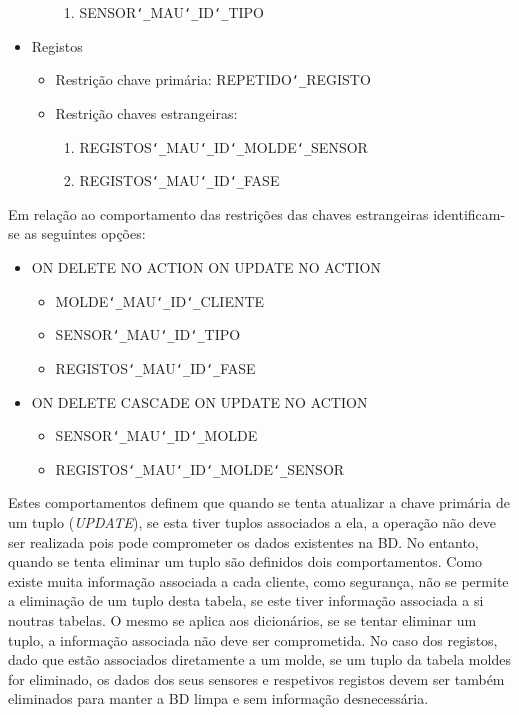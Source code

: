 \documentclass[11pt,twoside,a4paper]{report}
\begin{document}
\begin{itemize}[noitemsep]
\begin{itemize}[noitemsep]
\begin{enumerate}
			\item SENSOR\texttt{\char`_}MAU\texttt{\char`_}ID\texttt{\char`_}TIPO
		\end{enumerate}
	\end{itemize}
	\item Registos
	\begin{itemize}[noitemsep]
		\item Restrição chave primária: REPETIDO\texttt{\char`_}REGISTO
		\item Restrição chaves estrangeiras:
		\begin{enumerate}
			\item REGISTOS\texttt{\char`_}MAU\texttt{\char`_}ID\texttt{\char`_}MOLDE\texttt{\char`_}SENSOR
			\item REGISTOS\texttt{\char`_}MAU\texttt{\char`_}ID\texttt{\char`_}FASE
		\end{enumerate}
	\end{itemize}
\end{itemize}
Em relação ao comportamento das restrições das chaves estrangeiras identificam-se as seguintes opções:
\begin{itemize}
	\item ON DELETE NO ACTION ON UPDATE NO ACTION
	\begin{itemize}
		\item MOLDE\texttt{\char`_}MAU\texttt{\char`_}ID\texttt{\char`_}CLIENTE
		\item SENSOR\texttt{\char`_}MAU\texttt{\char`_}ID\texttt{\char`_}TIPO
		\item REGISTOS\texttt{\char`_}MAU\texttt{\char`_}ID\texttt{\char`_}FASE
	\end{itemize}
	\item ON DELETE CASCADE ON UPDATE NO ACTION
	\begin{itemize}
		\item SENSOR\texttt{\char`_}MAU\texttt{\char`_}ID\texttt{\char`_}MOLDE
		\item REGISTOS\texttt{\char`_}MAU\texttt{\char`_}ID\texttt{\char`_}MOLDE\texttt{\char`_}SENSOR
	\end{itemize}
\end{itemize}
Estes comportamentos definem que quando se tenta atualizar a chave primária de um tuplo (\textit{UPDATE}), se esta tiver tuplos associados a ela, a operação não deve ser realizada pois pode comprometer os dados existentes na BD. No entanto, quando se tenta eliminar um tuplo são definidos dois comportamentos. Como existe muita informação associada a cada cliente, como segurança, não se permite a eliminação de um tuplo desta tabela, se este tiver informação associada a si noutras tabelas. O mesmo se aplica aos dicionários, se se tentar eliminar um tuplo, a informação associada não deve ser comprometida. No caso dos registos, dado que estão associados diretamente a um molde, se um tuplo da tabela moldes for eliminado, os dados dos seus sensores e respetivos registos devem ser também eliminados para manter a BD limpa e sem informação desnecessária.\par 
\end{document}
